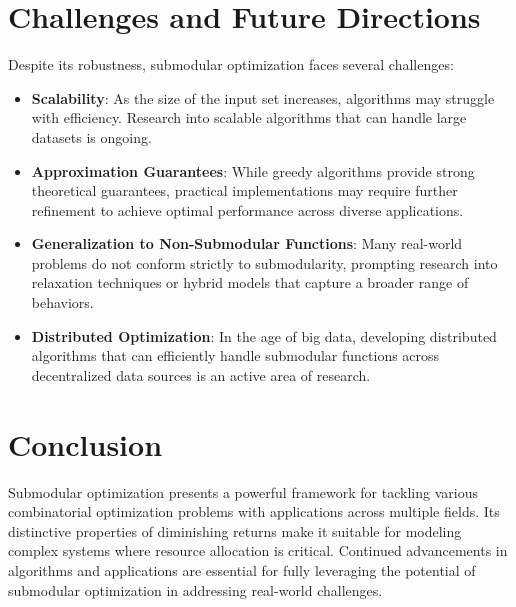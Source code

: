\section{Challenges and Future Directions}
Despite its robustness, submodular optimization faces several challenges:

\begin{itemize}
	\item \textbf{Scalability}: As the size of the input set increases, algorithms may struggle with efficiency. Research into scalable algorithms that can handle large datasets is ongoing.
	
	\item \textbf{Approximation Guarantees}: While greedy algorithms provide strong theoretical guarantees, practical implementations may require further refinement to achieve optimal performance across diverse applications.
	
	\item \textbf{Generalization to Non-Submodular Functions}: Many real-world problems do not conform strictly to submodularity, prompting research into relaxation techniques or hybrid models that capture a broader range of behaviors.
	
	\item \textbf{Distributed Optimization}: In the age of big data, developing distributed algorithms that can efficiently handle submodular functions across decentralized data sources is an active area of research.
\end{itemize}

\section{Conclusion}
Submodular optimization presents a powerful framework for tackling various combinatorial optimization problems with applications across multiple fields. Its distinctive properties of diminishing returns make it suitable for modeling complex systems where resource allocation is critical. Continued advancements in algorithms and applications are essential for fully leveraging the potential of submodular optimization in addressing real-world challenges.